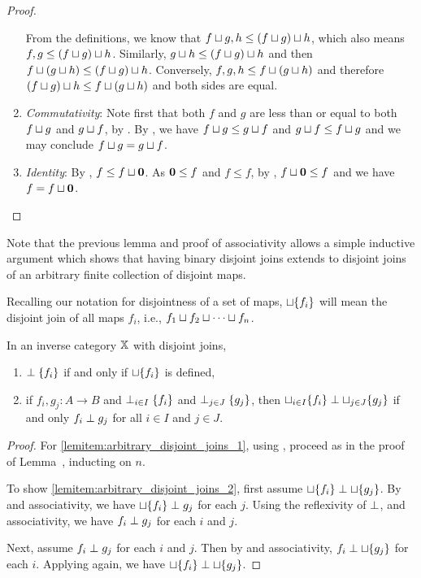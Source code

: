 \begin{proof}
\begin{enumerate}[{(}i{)}]
      From the definitions, we know that $f\sqcup g, h \le (f\sqcup g)\sqcup h$, which also means
      $f, g \le (f\sqcup g)\sqcup h$. Similarly, $g\sqcup h \le (f\sqcup g)\sqcup h $ and then $f
      \sqcup (g\sqcup h)\le (f\sqcup g)\sqcup h$. Conversely, $f,g,h \le f \sqcup (g\sqcup h)$ and
      therefore $(f\sqcup g)\sqcup h \le f \sqcup (g\sqcup h)$ and both sides are equal.
    \item \emph{Commutativity}: Note first that both $f$ and $g$ are less than or equal to both
      $f\sqcup g$ and $g \sqcup f$, by . By , we have $f \sqcup g \le
      g\sqcup f$ and $g\sqcup f \le f \sqcup g$ and we may conclude $f \sqcup g = g \sqcup f$.
    \item \emph{Identity}: By , $f \le f \sqcup \mathbf{0}$. As $\mathbf{0} \le f$ and $f \le
      f$, by , $f \sqcup \mathbf{0} \le f$ and we have $f = f \sqcup \mathbf{0}$.
  \end{enumerate}
\end{proof}

Note that the previous lemma and proof of associativity allows a simple inductive argument which
shows that having binary disjoint joins extends to disjoint joins of an arbitrary
finite collection of disjoint maps.

Recalling our notation for disjointness of a set of maps,
$\sqcup \{f_i\}$ will mean the disjoint join of all maps $f_i$, i.e.,
$f_1 \sqcup f_2 \sqcup \cdots \sqcup f_n$.

\begin{lemma}\label{lem:arbitrary_disjoint_joins}
  In an inverse category $\mathbb{X}$ with disjoint joins,
  \begin{enumerate}[{(}i{)}]
    \item $\perp \{f_i\}$ if and only if  $\sqcup \{f_i\}$ is
      defined,\label{lemitem:arbitrary_disjoint_joins_1}
    \item if $f_i, g_j : A \to B$ and $\perp_{i\in I} \{f_i\}$ and $\perp_{j\in J} \{g_j\}$,
      then $\sqcup_{i\in I} \{f_i\} \perp \sqcup_{j\in J} \{g_j\}$ if and only $f_i \perp g_j$
      for all $i\in I$ and $j\in J$. \label{lemitem:arbitrary_disjoint_joins_2}
  \end{enumerate}
\end{lemma}
\begin{proof}
  For \ref{lemitem:arbitrary_disjoint_joins_1}, using , proceed as in the proof of
  Lemma~,
  inducting on $n$.

  To show \ref{lemitem:arbitrary_disjoint_joins_2}, first assume $\sqcup \{f_i\} \perp \sqcup
  \{g_j\}$. By  and associativity, we have $\sqcup \{f_i\} \perp g_j$ for each
  $j$. Using the reflexivity of $\perp$,  and associativity, we have $f_i \perp
  g_j$ for each $i$ and $j$.

  Next, assume $f_i \perp g_j$ for each $i$ and $j$. Then by  and associativity, $f_i
  \perp \sqcup \{g_j\}$ for each $i$. Applying  again, we have $\sqcup \{f_i\} \perp
  \sqcup \{g_j\}$.
\end{proof}

